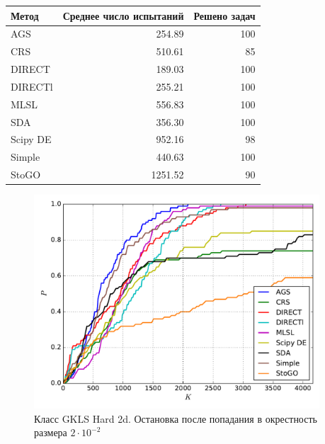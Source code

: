 \documentclass[a4paper]{article}
\begin{document}
\begin{tabular}{lrr}
\hline
 Метод    &   Среднее число испытаний &   Решено задач \\
\hline
 AGS      &                    254.89 &            100 \\
 CRS      &                    510.61 &             85 \\
 DIRECT   &                    189.03 &            100 \\
 DIRECTl  &                    255.21 &            100 \\
 MLSL     &                    556.83 &            100 \\
 SDA      &                    356.30 &            100 \\
 Scipy DE &                    952.16 &             98 \\
 Simple   &                    440.63 &            100 \\
 StoGO    &                   1251.52 &             90 \\
\hline
\end{tabular}
\begin{figure}[H]
  \center
  \includegraphics[width=0.95\textwidth]{../experiments/gklsh2d/cmc.pdf}
  \caption{Класс GKLS Hard 2d. Остановка после попадания в окрестность размера $2\cdot10^{-2}$}
  \label{fig:}
\end{figure}
\end{document}
